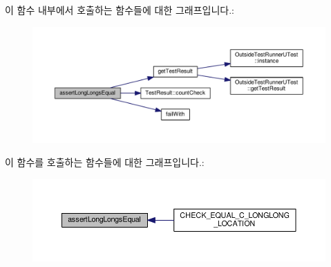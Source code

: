 이 함수 내부에서 호출하는 함수들에 대한 그래프입니다.\+:
\nopagebreak
\begin{figure}[H]
\begin{center}
\leavevmode
\includegraphics[width=350pt]{class_utest_shell_a6e6e9c53326383b31d85583ccf4be4c3_cgraph}
\end{center}
\end{figure}




이 함수를 호출하는 함수들에 대한 그래프입니다.\+:
\nopagebreak
\begin{figure}[H]
\begin{center}
\leavevmode
\includegraphics[width=350pt]{class_utest_shell_a6e6e9c53326383b31d85583ccf4be4c3_icgraph}
\end{center}
\end{figure}


